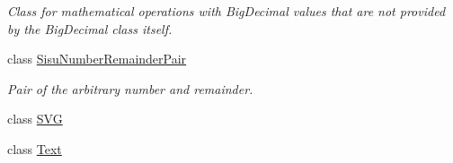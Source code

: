 \begin{DoxyCompactItemize}
\begin{DoxyCompactList}\small\item\em Class for mathematical operations with Big\+Decimal values that are not provided by the Big\+Decimal class itself. \end{DoxyCompactList}\item 
class \hyperlink{classcom_1_1aarrelaakso_1_1drawl_1_1_sisu_number_remainder_pair}{Sisu\+Number\+Remainder\+Pair}
\begin{DoxyCompactList}\small\item\em Pair of the arbitrary number and remainder. \end{DoxyCompactList}\item 
class \hyperlink{classcom_1_1aarrelaakso_1_1drawl_1_1_s_v_g}{S\+VG}
\item 
class \hyperlink{classcom_1_1aarrelaakso_1_1drawl_1_1_text}{Text}
\end{DoxyCompactItemize}
